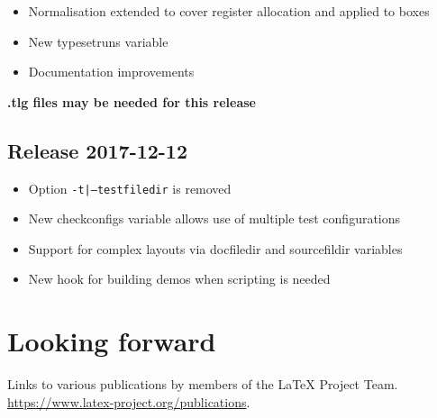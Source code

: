 \documentclass{ltnews}
\begin{document}
\begin{itemize}
\item Normalisation extended to cover
  register allocation and
   applied to boxes
\item New typesetruns variable
\item Documentation improvements
\end{itemize}


\textbf{.tlg files may be needed for this release}

\subsection{Release 2017-12-12}

\begin{itemize}
\item Option \texttt{-t|--testfiledir} is removed
\item New checkconfigs variable allows use of multiple test
  configurations
\item Support for complex layouts via docfiledir and sourcefildir
  variables
\item New hook for building demos when scripting is needed
\end{itemize}


\section{}

\section{}





\section{Looking forward}


\begin{thebibliography}{10}
  \raggedright
    Links to various publications by members of the \LaTeX{} Project Team.
    \newblock \url{https://www.latex-project.org/publications}.
\end{thebibliography}
\end{document}

